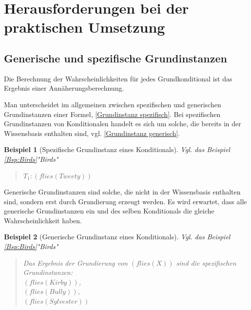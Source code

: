 \documentclass[a4paper, 11pt]{book}
\newtheorem{Bsp}{Beispiel}[section]
\begin{document}
{\begin{itemize}
	
\end{itemize}

\section{Herausforderungen bei der praktischen Umsetzung} \label{Herausforderungen}
\subsection{Generische und spezifische Grundinstanzen}
Die Berechnung der Wahrscheinlichkeiten für jedes Grundkonditional ist das Ergebnis einer Annäherungsberechnung.

Man unterscheidet im allgemeinen zwischen spezifischen und generischen Grundinstanzen einer Formel,   \ref{Grundinstanz spezifisch}.
Bei spezifischen Grundinstanzen von Konditionalen handelt es sich um solche, die bereits in der Wissensbasis enthalten sind, vgl. \ref{Grundinstanz generisch}. 

\label{Bsp:Spez Grundinstanz} 
\begin{Bsp}[Spezifische Grundinstanz eines Konditionals]
	Vgl. das Beispiel \\ \ref{Bsp:Birds}"{}Birds"{}
	\begin{quote}
		$ T_{1}  :  (flies(Tweety)) $\\
	\end{quote}
\end{Bsp}

Generische Grundinstanzen sind solche, die nicht in der Wissensbasis enthalten sind, sondern erst durch Grundierung erzeugt werden. 
Es wird erwartet, dass alle generische Grundinstanzen ein und des selben Konditionals die gleiche Wahrscheinlichkeit haben.

\label{Bsp:Gen Grundinstanz} 
\begin{Bsp}[Generische Grundinstanz eines Konditionals]
	Vgl. das Beispiel \\ \ref{Bsp:Birds}"{}Birds"{}
	\begin{quote}
		Das Ergebnis der Grundierung von $ (flies(X)) $ sind die spezifischen Grundinstanzen:\\
		$ (flies(Kirby)) $,\\
		$ (flies(Bully)) $,\\
		$ (flies(Sylvester)) $\\
		
	\end{quote}
\end{Bsp}

}
\end{document}

